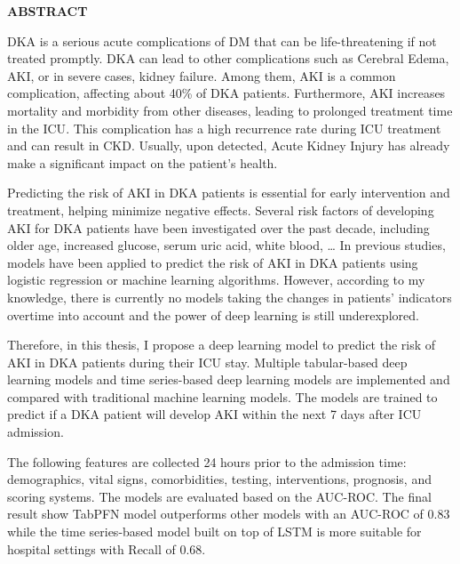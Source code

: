 \documentclass[../main.tex]{subfiles}
\begin{document}
\begin{center}
    \Large{\textbf{ABSTRACT}}\\
\end{center}
\vspace{1cm}

\gls{DKA} is a serious acute complications of \gls{DM} that can be life-threatening if not treated promptly.
DKA can lead to other complications such as Cerebral Edema, \gls{AKI}, or in severe cases, kidney failure.
Among them, \gls{AKI} is a common complication, affecting about 40\% of \gls{DKA} patients.
Furthermore, \gls{AKI} increases mortality and morbidity from other diseases, leading to prolonged treatment time in the \gls{ICU}.
This complication has a high recurrence rate during \gls{ICU} treatment and can result in \gls{CKD}.
Usually, upon detected, Acute Kidney Injury has already make a significant impact on the patient's health.

\par Predicting the risk of \gls{AKI} in \gls{DKA} patients is essential for early intervention and treatment, helping minimize negative effects.
Several risk factors of developing \gls{AKI} for \gls{DKA} patients have been investigated over the past decade, including older age, increased glucose, serum uric acid, white blood, \dots
In previous studies, models have been applied to predict the risk of \gls{AKI} in \gls{DKA} patients using logistic regression or machine learning algorithms.
However, according to my knowledge, there is currently no models taking the changes in patients' indicators overtime into account and the power of deep learning is still underexplored.

\par Therefore, in this thesis, I propose a deep learning model to predict the risk of \gls{AKI} in \gls{DKA} patients during their \gls{ICU} stay.
Multiple tabular-based deep learning models and time series-based deep learning models are implemented and compared with traditional machine learning models.
The models are trained to predict if a \gls{DKA} patient will develop \gls{AKI} within the next 7 days after \gls{ICU} admission.

The following features are collected 24 hours prior to the admission time: demographics, vital signs, comorbidities, testing, interventions, prognosis, and scoring systems. 
The models are evaluated based on the \gls{AUC-ROC}. 
The final result show TabPFN model outperforms other models with an AUC-ROC of 0.83 while the time series-based model built on top of \gls{LSTM} is more suitable for hospital settings with Recall of 0.68.

\end{document}
